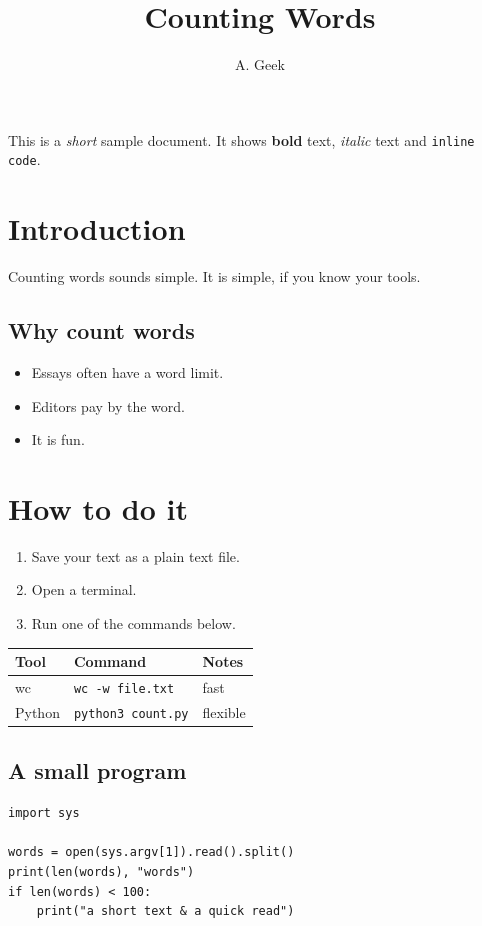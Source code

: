 \documentclass[a4paper,11pt]{article}
\title{Counting Words}
\author{A. Geek}
\date{}  %
\begin{document}
\maketitle        %

This is a \emph{short} sample document. It shows
\textbf{bold} text, \emph{italic} text and
\verb|inline code|.

\section{Introduction}  %
Counting words sounds simple. It is simple,
if you know your tools.

\subsection{Why count words}
\begin{itemize}  %
  \item Essays often have a word limit.
  \item Editors pay by the word.
  \item It is fun.
\end{itemize}

\section{How to do it}
\begin{enumerate}  %
  \item Save your text as a plain text file.
  \item Open a terminal.
  \item Run one of the commands below.
\end{enumerate}

\begin{tabular}{lll}
  \hline
  Tool   & Command                 & Notes    \\
  \hline
  wc     & \verb|wc -w file.txt|    & fast     \\
  Python & \verb|python3 count.py| & flexible \\
  \hline
\end{tabular}

\subsection{A small program}
\begin{verbatim}
import sys

words = open(sys.argv[1]).read().split()
print(len(words), "words")
if len(words) < 100:
    print("a short text & a quick read")
\end{verbatim}
\end{document}
